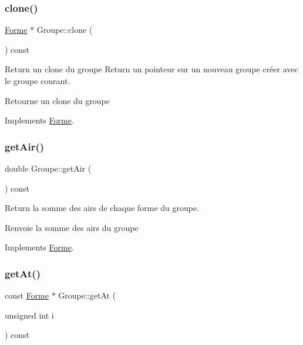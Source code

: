 \subsubsection{\texorpdfstring{clone()}{clone()}}
{\footnotesize\ttfamily \mbox{\hyperlink{class_forme}{Forme}} $\ast$ Groupe\+::clone (\begin{DoxyParamCaption}{ }\end{DoxyParamCaption}) const\hspace{0.3cm}{\ttfamily [virtual]}}



Return un clone du groupe Return un pointeur sur un nouveau groupe créer avec le groupe courant. 

Retourne un clone du groupe 

Implements \mbox{\hyperlink{class_forme}{Forme}}.

\mbox{\label{class_groupe_ac002fde356ceb23ad7464cb802191765}} 
\subsubsection{\texorpdfstring{getAir()}{getAir()}}
{\footnotesize\ttfamily double Groupe\+::get\+Air (\begin{DoxyParamCaption}{ }\end{DoxyParamCaption}) const\hspace{0.3cm}{\ttfamily [virtual]}}



Return la somme des airs de chaque forme du groupe. 

Renvoie la somme des airs du groupe 

Implements \mbox{\hyperlink{class_forme}{Forme}}.

\mbox{\label{class_groupe_a6b775538d63e633ea835bdbaa2afd233}} 
\subsubsection{\texorpdfstring{getAt()}{getAt()}}
{\footnotesize\ttfamily const \mbox{\hyperlink{class_forme}{Forme}} $\ast$ Groupe\+::get\+At (\begin{DoxyParamCaption}\item[{unsigned int}]{i }\end{DoxyParamCaption}) const}



